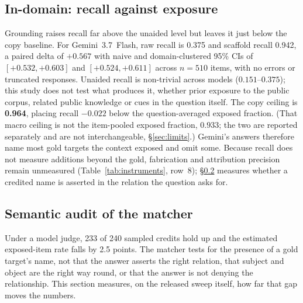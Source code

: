 \documentclass[10pt,twocolumn]{article}
\begin{document}
\subsection{In-domain: recall against exposure}\label{sec:indomain}
Grounding raises recall far above the unaided level but leaves it just below the copy baseline. For Gemini~3.7~Flash, raw recall is 0.375 and scaffold recall 0.942, a paired delta of $\mathbf{+0.567}$ with naive and domain-clustered 95\% CIs of $[+0.532,+0.603]$ and $[+0.524,+0.611]$ across $n=510$ items, with no errors or truncated responses. Unaided recall is non-trivial across models ($0.151$--$0.375$); this study does not test what produces it, whether prior exposure to the public corpus, related public knowledge or cues in the question itself. The copy ceiling is \textbf{0.964}, placing recall $-0.022$ below the question-averaged exposed fraction. (That macro ceiling is not the item-pooled exposed fraction, $0.933$; the two are reported separately and are not interchangeable, \S\ref{sec:limits}.) Gemini's answers therefore name most gold targets the context exposed and omit some. Because recall does not measure additions beyond the gold, fabrication and attribution precision remain unmeasured (Table~\ref{tab:instruments}, row~8); \S\ref{sec:audit} measures whether a credited name is asserted in the relation the question asks for.

\subsection{Semantic audit of the matcher}\label{sec:audit}
Under a model judge, 233 of 240 sampled credits hold up and the estimated exposed-item rate falls by 2.5 points. The matcher tests for the presence of a gold target's name, not that the answer asserts the right relation, that subject and object are the right way round, or that the answer is not denying the relationship. This section measures, on the released sweep itself, how far that gap moves the numbers.
\end{document}
